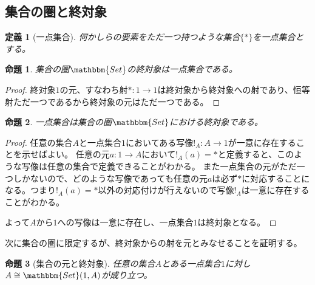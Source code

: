 \documentclass[dvipdfmx]{jsarticle}
\newcommand{\cat}[1]{\mathbbm{#1}}
\newcommand{\arrow}{\rightarrow}
\newcommand{\mor}[3]{#1:#2\arrow #3}
\newcommand{\arset}[3]{\cat{#1}(#2,#3)}
\newtheorem{proof}{証明}[section]
\newtheorem{prop}{命題}[section]
\newtheorem{define}{定義}[section]
\numberwithin{proof}{subsection}
\numberwithin{prop}{subsection}
\numberwithin{define}{subsection}
\begin{document}
	\subsection{集合の圏と終対象}
	\begin{define}[一点集合]
		何かしらの要素をただ一つ持つような集合$\{*\}$を一点集合とする。
	\end{define}
	\begin{prop}
		集合の圏$\cat{Set}$の終対象は一点集合である。
	\end{prop}
	\begin{proof}
		終対象$1$の元、すなわち射$\mor{*}{1}{1}$は終対象から終対象への射であり、恒等射ただ一つであるから終対象の元はただ一つである。
	\end{proof}
	\begin{prop}
		一点集合は集合の圏$\cat{Set}$における終対象である。
	\end{prop}
	\begin{proof}
		任意の集合$A$と一点集合$1$においてある写像$\mor{!_A}{A}{1}$が一意に存在することを示せばよい。
		任意の元$\mor{a}{1}{A}$において$!_A(a)=*$と定義すると、このような写像は任意の集合で定義できることがわかる。
		また一点集合の元がただ一つしかないので、どのような写像であっても任意の元$a$は必ず$*$に対応することになる。つまり$!_A(a)=*$以外の対応付けが行えないので写像$!_A$は一意に存在することがわかる。

		よって$A$から$1$への写像は一意に存在し、一点集合$1$は終対象となる。
	\end{proof}
	次に集合の圏に限定するが、終対象からの射を元とみなせることを証明する。
	\begin{prop}[集合の元と終対象]
		任意の集合$A$とある一点集合$1$に対し$A\cong\arset{Set}{1}{A}$が成り立つ。
	\end{prop}
\end{document}
